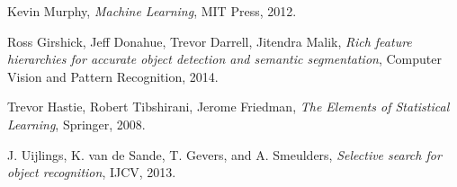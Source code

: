 \documentclass [11pt,letterpaper ,twoside ,openany ]{report}
\begin{document}
\begin{thebibliography}{9}
          Kevin Murphy,
          \textit{Machine Learning},
          MIT Press,
          2012.            

          Ross Girshick, Jeff Donahue, Trevor Darrell, Jitendra Malik,
          \textit{Rich feature hierarchies for accurate object detection and semantic segmentation},
          Computer Vision and Pattern Recognition,
          2014.                                           

          Trevor Hastie, Robert Tibshirani, Jerome Friedman,
          \textit{The Elements of Statistical Learning},
          Springer,
          2008.                         

          J. Uijlings, K. van de Sande, T. Gevers, and A. Smeulders,
          \textit{Selective search for object recognition},
          IJCV,
          2013.                         

    \end{thebibliography}
\end{document}

